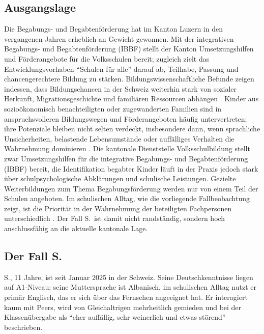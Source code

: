 \documentclass[ngerman, a4paper]{article}
\begin{document}
\subsection*{Ausgangslage}
 
Die Begabungs- und Begabtenförderung hat im Kanton Luzern in den vergangenen Jahren
erheblich an Gewicht gewonnen. Mit der integrativen Begabungs- und Begabtenförderung
(IBBF) stellt der Kanton Umsetzungshilfen und Förderangebote für die Volksschulen bereit;
zugleich zielt das Entwicklungsvorhaben \enquote{Schulen für alle} darauf ab, Teilhabe, Passung
und chancengerechtere Bildung zu stärken. Bildungswissenschaftliche Befunde zeigen
indessen, dass Bildungschancen in der Schweiz weiterhin stark von sozialer Herkunft,
Migrationsgeschichte und familiären Ressourcen abhängen
\parencites[S.\,45--48]{erzinger2023pisa}[S.\,576--585]{stamm2021fehlenderblick}[S.\,34,\,37]{bfs2022migration}[S.\,317--319]{grossenbacher2014integrative}.
Kinder aus sozioökonomisch benachteiligten oder zugewanderten Familien sind in
anspruchsvolleren Bildungswegen und Förderangeboten häufig untervertreten; ihre Potenziale
bleiben nicht selten verdeckt, insbesondere dann, wenn sprachliche Unsicherheiten, belastende
Lebensumstände oder auffälliges Verhalten die Wahrnehmung dominieren
\parencites[S.\,76--78]{kellerkoller2021hellekoepfe}[S.\,6--8]{leikhof2021jugendliche}.
Die kantonale Dienststelle Volksschulbildung stellt zwar Umsetzungshilfen für die
integrative Begabungs- und Begabtenförderung (IBBF) bereit, die Identifikation
begabter Kinder läuft in der Praxis jedoch stark über schulpsychologische
Abklärungen und schulische Leistungen. Gezielte Weiterbildungen zum Thema
Begabungsförderung werden nur von einem Teil der Schulen angeboten. Im
schulischen Alltag, wie die vorliegende Fallbeobachtung zeigt, ist die
Priorität in der Wahrnehmung der beteiligten Fachpersonen unterschiedlich
\parencite{dvs2025bbf}. Der Fall S.\ ist damit nicht randständig, sondern
hoch anschlussfähig an die aktuelle kantonale Lage.
 
\subsection*{Der Fall S.}
 
S., 11 Jahre, ist seit Januar 2025 in der Schweiz. Seine Deutschkenntnisse liegen auf
A1-Niveau; seine Muttersprache ist Albanisch, im schulischen Alltag nutzt er primär
Englisch, das er sich über das Fernsehen angeeignet hat. Er interagiert kaum mit Peers,
wird von Gleichaltrigen mehrheitlich gemieden und bei der Klassenübergabe als
\enquote{eher auffällig, sehr weinerlich und etwas störend} beschrieben.
 
\end{document}
